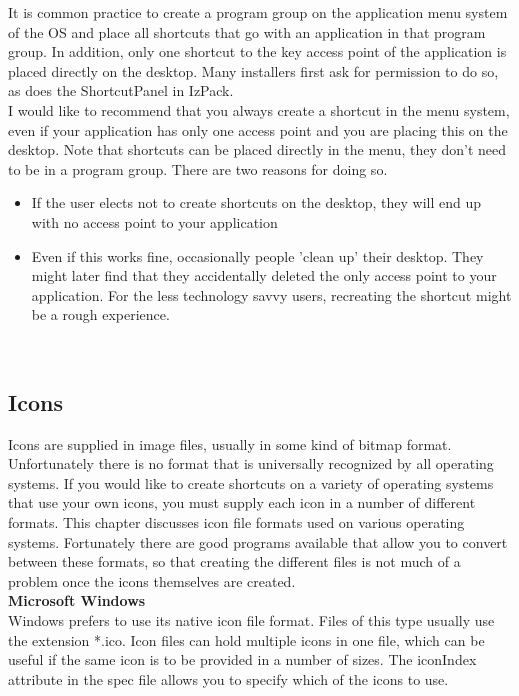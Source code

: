 It is common practice to create a program group on the application menu
system of the OS and place all shortcuts that go with an application in
that program group. In addition, only one shortcut to the key access
point of the application is placed directly on the desktop. Many
installers first ask for permission to do so, as does the ShortcutPanel
in IzPack.\\

I would like to recommend that you always create a shortcut in the menu
system, even if your application has only one access point and you are
placing this on the desktop. Note that shortcuts can be placed directly
in the menu, they don't need to be in a program group. There are two
reasons for doing so.\\

\begin{itemize}
\item If the user elects not to create shortcuts on the desktop, they
      will end up with no access point to your application
\item Even if this works fine, occasionally people 'clean up' their
      desktop. They might later find that they accidentally deleted the
      only access point to your application. For the less technology
      savvy users, recreating the shortcut might be a rough experience.
\end{itemize}\

\subsection{Icons}

Icons are supplied in image files, usually in some kind of bitmap
format. Unfortunately there is no format that is universally recognized
by all operating systems. If you would like to create shortcuts on a
variety of operating systems that use your own icons, you must supply
each icon in a number of different formats. This chapter discusses icon
file formats used on various operating systems. Fortunately there are
good programs available that allow you to convert between these formats,
so that creating the different files is not much of a problem once the
icons themselves are created.\\

\textbf{Microsoft Windows}\\

Windows prefers to use its native icon file format. Files of this type
usually use the extension *.ico. Icon files can hold multiple icons in
one file, which can be useful if the same icon is to be provided in a
number of sizes. The iconIndex attribute in the spec file allows you to
specify which of the icons to use.\\

